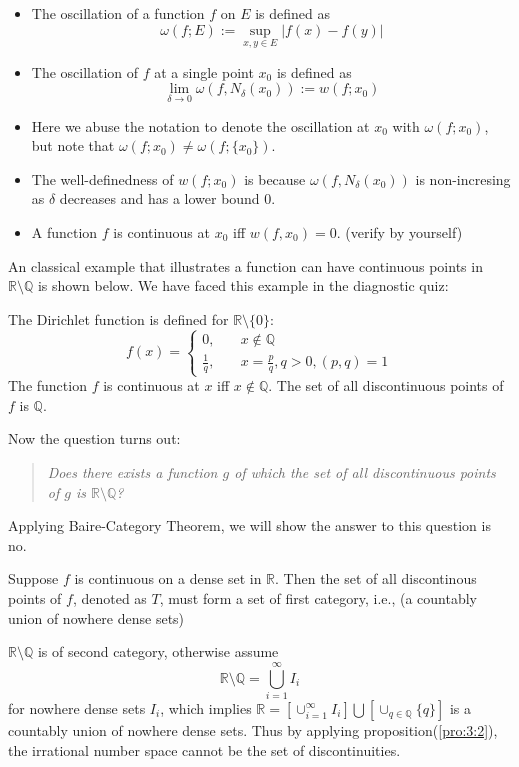 \begin{definition}[oscillation]
\begin{itemize}
\item
The oscillation of a function $f$ on $E$ is defined as
\[
\omega(f;E) := \sup_{x,y\in E}|f(x) - f(y)|
\]
\item
The oscillation of $f$ at a single point $x_0$ is defined as
\[
\lim_{\delta\to0}\omega(f,N_\delta(x_0)) := w(f;x_0)
\]
\end{itemize}
\end{definition}
\begin{remark}
\begin{itemize}
\item
Here we abuse the notation to denote the oscillation at $x_0$ with $\omega(f;x_0)$, but note that $\omega(f;x_0)\ne \omega(f;\{x_0\})$.
\item
The well-definedness of $w(f;x_0)$ is because $\omega(f,N_\delta(x_0))$ is non-incresing as $\delta$ decreases and has a lower bound $0$.
\item
A function $f$ is continuous at $x_0$ iff $w(f,x_0) = 0$. (verify by yourself)
\end{itemize}
\end{remark}
An classical example that illustrates a function can have continuous points in $\mathbb{R}\setminus\mathbb{Q}$ is shown below. We have faced this example in the diagnostic quiz:
\begin{example}
The Dirichlet function is defined for $\mathbb{R}\setminus\{0\}$:
\[
f(x) = \left\{
\begin{aligned}
0,&\quad x\notin\mathbb{Q}\\
\frac{1}{q},&\quad x=\frac{p}{q},q>0,(p,q)=1
\end{aligned}
\right.
\]
The function $f$ is continuous at $x$ iff $x\notin\mathbb{Q}$. 
The set of all discontinuous points of $f$ is $\mathbb{Q}$. 
\end{example}
Now the question turns out:
\begin{quotation}
\textit{
Does there exists a function $g$ of which the set of all discontinuous points of $g$ is $\mathbb{R}\setminus\mathbb{Q}$?
}
\end{quotation}

Applying Baire-Category Theorem, we will show the answer to this question is no.

\begin{proposition}\label{pro:3:2}
Suppose $f$ is continuous on a dense set in $\mathbb{R}$. Then the set of all discontinous points of $f$, denoted as $T$, must form a set of first category, i.e., (a countably union of nowhere dense sets)
\end{proposition}
\begin{remark}
$\mathbb{R}\setminus\mathbb{Q}$ is of second category, otherwise assume
\[
\mathbb{R}\setminus\mathbb{Q}=\bigcup_{i=1}^\infty I_i
\]
for nowhere dense sets $I_i$, which implies $\mathbb{R}=[\cup_{i=1}^\infty I_i]\bigcup[\cup_{q\in\mathbb{Q}}\{q\}]$ is a countably union of nowhere dense sets. Thus by applying proposition(\ref{pro:3:2}), the irrational number space cannot be the set of discontinuities.
\end{remark}

